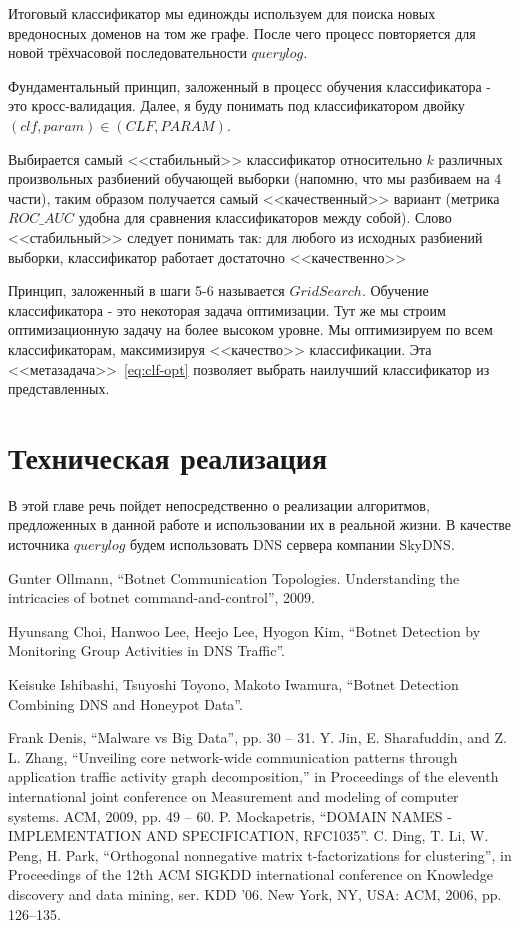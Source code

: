 \documentclass[14pt]{extreport}
\begin{document}
	
	Итоговый классификатор мы единожды используем для поиска новых вредоносных доменов на том же графе. После чего процесс повторяется для новой трёхчасовой последовательности $querylog$.
	
	Фундаментальный принцип, заложенный в процесс обучения классификатора - это кросс-валидация. Далее, я буду понимать под классификатором двойку $(clf, param) \in (CLF, PARAM)$. 
	
	Выбирается самый <<стабильный>> классификатор относительно $k$ различных произвольных разбиений обучающей выборки (напомню, что мы разбиваем на 4 части), таким образом получается самый <<качественный>> вариант (метрика $ROC\_AUC$ удобна для сравнения классификаторов между собой). Слово <<стабильный>> следует понимать так: для любого из исходных разбиений выборки, классификатор работает достаточно <<качественно>>
	
	Принцип, заложенный в шаги 5-6 называется $GridSearch$. Обучение классификатора - это некоторая задача оптимизации. Тут же мы строим оптимизационную задачу на более высоком уровне. Мы оптимизируем по всем классификаторам, максимизируя <<качество>> классификации. Эта <<метазадача>>~\eqref{eq:clf-opt} позволяет выбрать наилучший классификатор из представленных.
	

\chapter{Техническая реализация}
В этой главе речь пойдет непосредственно о реализации алгоритмов, предложенных в данной работе и использовании их в реальной жизни. В качестве источника $querylog$ будем использовать DNS сервера компании SkyDNS. 
	
\begin{thebibliography}{99}

 Gunter Ollmann, ``Botnet Communication Topologies. Understanding the intricacies of botnet command-and-control'', 2009.

 Hyunsang Choi, Hanwoo Lee, Heejo Lee, Hyogon Kim, ``Botnet Detection by Monitoring Group Activities in
DNS Traffic''.

 Keisuke Ishibashi, Tsuyoshi Toyono, Makoto Iwamura, ``Botnet Detection Combining DNS and Honeypot Data''.

 Frank Denis, ``Malware vs Big Data'', pp. 30 -- 31.
 Y. Jin, E. Sharafuddin, and Z. L. Zhang, “Unveiling core network-wide communication patterns through application traffic activity graph decomposition,” in Proceedings of the eleventh international joint conference on Measurement and modeling of computer systems. ACM, 2009, pp. 49 -- 60.
  P. Mockapetris, ``DOMAIN NAMES - IMPLEMENTATION AND SPECIFICATION, RFC1035''.
 C. Ding, T. Li, W. Peng, H. Park, ``Orthogonal nonnegative matrix t-factorizations for clustering'', in Proceedings of the 12th ACM SIGKDD
international conference on Knowledge discovery and data mining, ser.
KDD ’06. New York, NY, USA: ACM, 2006, pp. 126–135.
\end{thebibliography}
\end{document}

